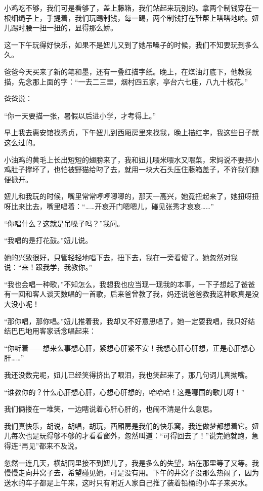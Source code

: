 \par 小鸡吃不够，我们可是看够了，盖上藤箱，我们站起来玩别的。拿两个制钱穿在一根细绳子上，手提着，我们玩踢制钱，每一踢，两个制钱打在鞋帮上嗒嗒地响。妞儿踢时腰一扭一扭的，显得那么娇。
\par 这一下午玩得好快乐，如果不是妞儿又到了她吊嗓子的时候，我们不知要玩到多么久。
\par 爸爸今天买来了新的笔和墨，还有一叠红描字纸。晚上，在煤油灯底下，他教我描，先念那上面的字：“一去二三里，烟村四五家，亭台六七座，八九十枝花。”
\par 爸爸说：
\par “你一天要描一张，暑假以后进小学，才考得上。”
\par 早上我去惠安馆找秀贞，下午妞儿到西厢房里来找我，晚上描红字，我这些日子就这么过的。
\par 小油鸡的黄毛上长出短短的翅膀来了，我和妞儿喂米喂水又喂菜，宋妈说不要把小鸡肚子撑坏了，也怕被野猫给叼了去，就用一块大石头压住藤箱盖子，不许我们随便掀开。
\par 妞儿和我玩的时候，嘴里常常哼哼唧唧的，那天一高兴，她竟扭起来了，她扭呀扭呀比来比去，嘴里唱着：“……开哀开门嗯嗯儿，碰见张秀才哀哀……”
\par “你唱什么？这就是吊嗓子吗？”我问。
\par “我唱的是打花鼓。”妞儿说。
\par 她的兴致很好，只管轻轻地唱下去，扭下去，我在一旁看傻了。她忽然对我说：“来！跟我学，我教你。”
\par “我也会唱一种歌，”不知怎么，我想我也应当现一现我的本事，一下子想起了爸爸有一回和客人谈天数唱的一首歌，后来爸曾教了我，妈还说爸爸教我这种歌真是没大没小呢！
\par “那你唱，那你唱。”妞儿推着我，我却又不好意思唱了，她一定要我唱，我只好结结巴巴地用客家话念唱起来：
\par “你听着——想来么事想心肝，紧想心肝紧不安！我想心肝心肝想，正是心肝想心肝……”
\par 我还没数完呢，妞儿已经笑得挤出了眼泪，我也笑起来了，那几句词儿真拗嘴。
\par “谁教你的？什么心肝想心肝，心想心肝想的，哈哈哈！这是哪国的歌儿呀！”
\par 我们俩搂在一堆笑，一边瞎说着心肝心肝的，也闹不清是什么意思。
\par 我们真快乐，胡说，胡唱，胡玩，西厢房是我们的快乐窝，我连做梦都想着它。妞儿每次也是玩得够不够的才看看窗外，忽然叫道：“可得回去了！”说完她就跑，急得连“再见”都来不及说。
\par 忽然一连几天，横胡同里接不到妞儿了，我是多么的失望，站在那里等了又等。我慢慢走向井窝子去，希望碰见她，可是没有用。下午的井窝子没那么热闹了，因为送水的车子都是上午来，这时只有附近人家自己推了装着铅桶的小车子来买水。
